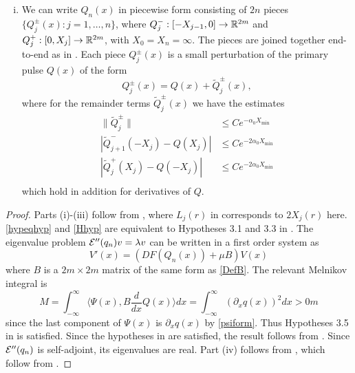 \documentclass[thesis.tex]{subfiles}
\begin{document}
\begin{theorem}
\begin{enumerate}[(i)]
\item We can write $Q_n(x)$ in piecewise form consisting of $2n$ pieces $\{ Q_j^\pm(x) : j = 1, \dots, n \}$, where $Q_j^-: [-X_{j-1}, 0] \rightarrow \mathbb{R}^{2m}$ and $Q_j^+: [0, X_j] \rightarrow \mathbb{R}^{2m}$, with $X_0 = X_n = \infty$. The pieces are joined together end-to-end as in \cite{Sandstede1998}. Each piece $Q_j^\pm(x)$ is a small perturbation of the primary pulse $Q(x)$ of the form
\begin{equation}\label{Qpmexpansions}
Q_j^\pm(x) = Q(x) + \tilde{Q}_j^\pm(x),
\end{equation}
where for the remainder terms $\tilde{Q}_j^\pm(x)$ we have the estimates
\begin{equation}\label{Qpmestimates}
\begin{aligned}
\|\tilde{Q}_j^\pm\| &\leq C e^{-\alpha_0 X_{\min}} \\
|\tilde{Q}_{j+1}^-(-X_j) - Q(X_j)| &\leq C e^{-2 \alpha_0 X_{\min}} \\
|\tilde{Q}_j^+(X_j) - Q(-X_j)| &\leq C e^{-2 \alpha_0 X_{\min}} \\
\end{aligned}
\end{equation}
which hold in addition for derivatives of $Q$.
\end{enumerate}
\begin{proof}
Parts (i)-(iii) follow from \cite{SandstedeStrut}, where $L_j(r)$ in \cite{SandstedeStrut} corresponds to $2X_j(r)$ here. \cref{hypeqhyp} and \cref{Hhyp} are equivalent to Hypotheses 3.1 and 3.3 in \cite{SandstedeStrut}. The eigenvalue problem $\mathcal{E}''(q_n)v = \lambda v$ can be written in a first order system as
\[
V'(x) = (DF(Q_n(x)) + \mu B )V(x)
\]
where $B$ is a $2m\times 2m$ matrix of the same form as \cref{DefB}. The relevant Melnikov integral is
\[
M = \int_{-\infty}^\infty \langle \Psi(x), B \frac{d}{dx} Q(x) \rangle  dx = \int_{-\infty}^\infty (\partial_x q(x))^2 dx > 0m
\]
since the last component of $\Psi(x)$ is $\partial_x q(x)$ by \cref{psiform}. Thus Hypotheses 3.5 in \cite{SandstedeStrut} is satisfied. Since the hypotheses in \cite{SandstedeStrut} are satisfied, the result follows from \cite[Theorem 3.6]{SandstedeStrut}. Since $\mathcal{E}''(q_n)$ is self-adjoint, its eigenvalues are real. Part (iv) follows from \cite[Theorem 2]{Sandstede1998}, which follow from \cite{Sandstede1993}.
\end{proof}
\end{theorem}
\end{document}
